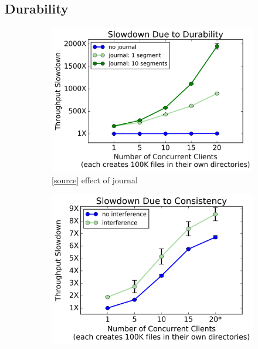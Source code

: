 \subsection{Durability}
\label{sec:durability}

\begin{figure}[t]
  \centering
  \begin{subfigure}[b]{.3\linewidth}
      \centering
      \includegraphics[width=1\linewidth]{graphs/slowdown-journal.png}
      \caption{[\href{https://github.com/michaelsevilla/cudele-popper/blob/revision/experiments/baseline-durability/visualize/viz.ipynb}{source}]
      effect of journal} \label{fig:overhead-a}
  \end{subfigure}
  \begin{subfigure}[b]{.3\linewidth}
      \centering
      \includegraphics[width=0.98\linewidth]{graphs/slowdown-interfere-scale.png}

\end{subfigure}
\end{figure}
